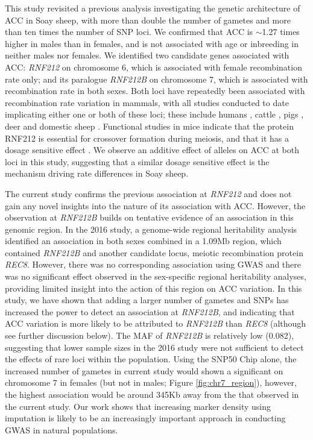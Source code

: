 \documentclass[a4paper,11pt]{article}
\begin{document}
This study revisited a previous analysis investigating the genetic architecture of ACC in Soay sheep, with more than double the number of gametes and more than ten times the number of SNP loci. We confirmed that ACC is $\sim$1.27 times higher in males than in females, and is not associated with age or inbreeding in neither males nor females. We identified two candidate genes associated with ACC: \textit{RNF212} on chromosome 6, which is associated with female recombination rate only; and its paralogue \textit{RNF212B} on chromosome 7, which is associated with recombination rate in both sexes. Both loci have repeatedly been associated with recombination rate variation in mammals, with all studies conducted to date implicating either one or both of these loci; these include humans \citep{Kong2008, Kong2014}, cattle \citep{Sandor2012, Ma2015, Kadri2016}, pigs \citep{Johnsson2020}, deer \citep{Johnston2018} and domestic sheep \citep{Petit2017}. Functional studies in mice indicate that the protein RNF212 is essential for crossover formation during meiosis, and that it has a dosage sensitive effect \citep{Reynolds2013}. We observe an additive effect of alleles on ACC at both loci in this study, suggesting that a similar dosage sensitive effect is the mechanism driving rate differences in Soay sheep.

The current study confirms the previous association at \textit{RNF212} and does not gain any novel insights into the nature of its association with ACC. However, the observation at \textit{RNF212B} builds on tentative evidence of an association in this genomic region. In the 2016 study, a genome-wide regional heritability analysis identified an association in both sexes combined in a 1.09Mb region, which contained \textit{RNF212B} and another candidate locus, meiotic recombination protein \textit{REC8}. However, there was no corresponding association using GWAS and there was no significant effect observed in the sex-specific regional heritability analyses, providing limited insight into the action of this region on ACC variation. In this study, we have shown that adding a larger number of gametes and SNPs has increased the power to detect an association at \textit{RNF212B}, and indicating that ACC variation is more likely to be attributed to \textit{RNF212B} than \textit{REC8} (although see further discussion below). The MAF of \textit{RNF212B} is relatively low (0.082), suggesting that lower sample sizes in the 2016 study were not sufficient to detect the effects of rare loci within the population. Using the SNP50 Chip alone, the increased number of gametes in current study would shown a significant on chromosome 7 in females (but not in males; Figure \ref{fig:chr7_region}), however, the highest association would be around 345Kb away from the that observed in the current study. Our work shows that increasing marker density using imputation is likely to be an increasingly important approach in conducting GWAS in natural populations.  
\end{document}
